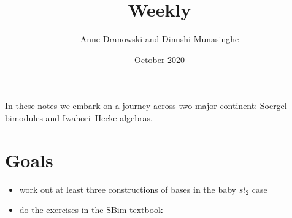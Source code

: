 \documentclass{article}
\title{Weekly}
\author{Anne Dranowski and Dinushi Munasinghe}
\date{October 2020}
\begin{document}
\maketitle

In these notes we embark on a journey across two major continent: Soergel bimodules and Iwahori--Hecke algebras. 

\section*{Goals}

\begin{itemize}
    \item work out at least three constructions of bases in the baby $sl_2$ case 
    \item do the exercises in the SBim textbook
\end{itemize}


\end{document}
